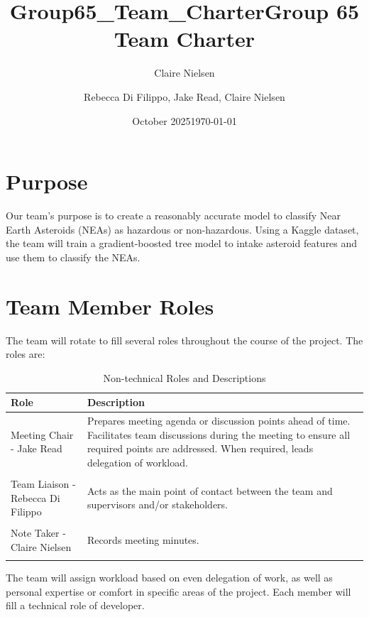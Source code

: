 \documentclass{article}
\title{Group65_Team_Charter}
\author{Claire Nielsen}
\date{October 2025}
\begin{document}
\title{Group 65 Team Charter}
\author{Rebecca Di Filippo, Jake Read, Claire Nielsen}
\date{\today}

\maketitle

\newpage
\section{Purpose}

Our team's purpose is to create a reasonably accurate model to classify Near Earth Asteroids (NEAs) as hazardous or non-hazardous. Using a Kaggle dataset, the team will train a gradient-boosted tree model to intake asteroid features and use them to classify the NEAs.

\section{Team Member Roles}

The team will rotate to fill several roles throughout the course of the project. The roles are: 

\begin{table}[ht]
\centering
\caption{Non-technical Roles and Descriptions}
\label{tab:non-technical-roles}
\begin{tabularx}{\textwidth}{lX}
\toprule
\textbf{Role} & \textbf{Description} \\
\midrule

Meeting Chair - Jake Read & Prepares meeting agenda or discussion points ahead of time. Facilitates team discussions during the meeting to ensure all required points are addressed. When required, leads delegation of workload.  \\ \\
Team Liaison - Rebecca Di Filippo & Acts as the main point of contact between the team and supervisors and/or stakeholders.  \\ \\
Note Taker - Claire Nielsen & Records meeting minutes. \\ \\
\bottomrule
\end{tabularx}
\end{table}

The team will assign workload based on even delegation of work, as well as personal expertise or comfort in specific areas of the project. Each member will fill a technical role of developer. \\
\end{document}
